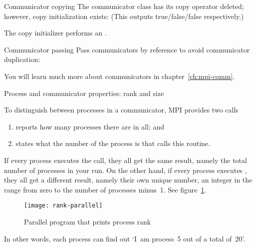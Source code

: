\begin{mplnote}{Communicator copying}
  The communicator class has its copy operator deleted;
  however, copy initialization exists:
  (This outputs true/false/false respectively.)

  \begin{mplimpl}
    The copy initializer performs an .
  \end{mplimpl}
\end{mplnote}

\begin{mplnote}{Communicator passing}
  Pass communicators by reference to avoid communicator duplication:
\end{mplnote}

You will
learn much more about communicators in chapter~\ref{ch:mpi-comm}.

 {Process and communicator properties: rank and size}

To distinguish between processes in a communicator, MPI provides two calls
\begin{enumerate}
\item {} reports how many processes there are in all; and
\item {} states what the number of the
  process is that calls this routine.
\end{enumerate}

If every process executes the  call, they all get the
same result, namely the total number of processes in your run.
%
On the
other hand, if every process executes , they all get
a different result, namely their own unique number, an integer in the
range from zero to the number of processes minus~1.
See figure~\ref{fig:rank-parallel}.
%
\begin{figure}[ht]
  \texttt{[image: rank-parallel]}
  \caption{Parallel program that prints process rank}
  \label{fig:rank-parallel}
\end{figure}
%
In other words, each process can find out `I~am process~5
out of a total of~20'.


